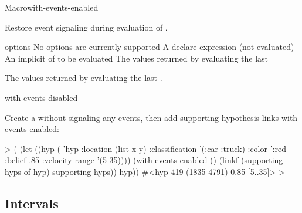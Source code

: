 \documentclass[10pt,twoside,english,pdftex]{article}
\begin{document}
\begin{functiondoc}{Macro}{with-events-enabled}%
  {
    }
%
%
  
\fnsyntax

\fnpurpose Restore event signaling during evaluation of .

\fnpackage {}

\fnmodule {}

\fnargs
\begin{args}{options}
\arg[option] No options are currently supported
\arg[declaration] A declare expression (not evaluated)
\arg[forms] An implicit  of  to be evaluated
\arg[results] The values returned by evaluating the last 
\end{args}

\fnreturns The values returned by evaluating the last .

\begin{alsos}{with-events-disabled}
\end{alsos}

\fnexample
{}%
Create a  without signaling any events, then add
supporting-hypothesis links with events enabled:
%
\W\supp
\begin{example}
  > (
       (let ((hyp ( 'hyp 
                     :location (list x y)
                     :classification '(:car :truck)
                     :color ':red
                     :belief .85
                     :velocity-range '(5 35))))
          (with-events-enabled ()
             (linkf (supporting-hyps-of hyp) supporting-hyps))
          hyp))
  #<hyp 419 (1835 4791) 0.85 [5..35]>
  >
\end{example}

\end{functiondoc}


\T\markright{}%
\T\pagestyle{plain}
\T\clearpage
\W{}
\T\pagestyle{fancy}
\T\thispagestyle{fancybottom}
\T\global\def\fnlastname{ }%

\subsection{Intervals}
\label{sec:interval}%
\end{document}
